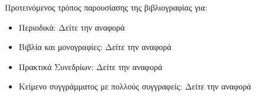 
Προτεινόμενος τρόπος παρουσίασης της βιβλιογραφίας για:

\begin{indented}
  \begin{itemize}
    \item Περιοδικά: Δείτε την αναφορά~\cite{wu2004}
    \item Βιβλία και μονογραφίες: Δείτε την αναφορά~\cite{levenspiel2002}   
    \item Πρακτικά Συνεδρίων: Δείτε την αναφορά~\cite{bock1984}
    \item Κείμενο συγγράμματος με πολλούς συγγραφείς: Δείτε την αναφορά~\cite{deuflhard1987}  
  \end{itemize}  
\end{indented}
